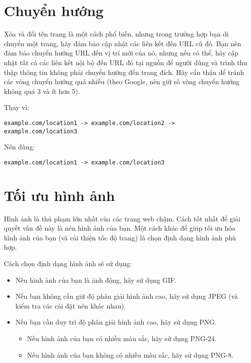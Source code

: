 \section{Chuyển hướng}
Xóa và đổi tên trang là một cách phổ biến, nhưng trong trường hợp bạn di chuyển một trang, hãy đảm bảo cập nhật các liên kết đến URL cũ đó. Bạn nên đảm bảo chuyển hướng URL đến vị trí mới của nó, nhưng nếu có thể, hãy cập nhật tất cả các liên kết nội bộ đến URL đó tại nguồn để người dùng và trình thu thập thông tin không phải chuyển hướng đến trang đích. Hãy cẩn thận để tránh các vòng chuyển hướng quá nhiều (theo Google, nên giữ số vòng chuyển hướng không quá 3 và ít hơn 5).
\par
Thay vì:
\begin{lstlisting}
example.com/location1 -> example.com/location2 -> example.com/location3
\end{lstlisting}
\par
Nên dùng:
\begin{lstlisting}
example.com/location1 -> example.com/location3
\end{lstlisting}
\section{Tối ưu hình ảnh}
Hình ảnh là thủ phạm lớn nhất của các trang web chậm. Cách tốt nhất để giải quyết vấn đề này là nén hình ảnh của bạn. Một cách khác để giúp tối ưu hóa hình ảnh của bạn (và cải thiện tốc độ trang) là chọn định dạng hình ảnh phù hợp.
\par
Cách chọn định dạng hình ảnh sẽ sử dụng:
\begin{itemize}
	\item Nếu hình ảnh của bạn là ảnh động, hãy sử dụng GIF.
	\item Nếu bạn không cần giữ độ phân giải hình ảnh cao, hãy sử dụng JPEG (và kiểm tra các cài đặt nén khác nhau).
	\item Nếu bạn cần duy trì độ phân giải hình ảnh cao, hãy sử dụng PNG.
	\begin{itemize}
		\item Nếu hình ảnh của bạn có nhiều màu sắc, hãy sử dụng PNG-24.
		\item Nếu hình ảnh của bạn không có nhiều màu sắc, hãy sử dụng PNG-8.
	\end{itemize}
\end{itemize}
